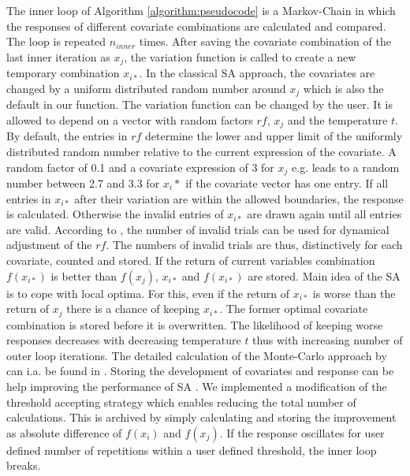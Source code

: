 The inner loop of Algorithm \ref{algorithm:pseudocode} is a Markov-Chain in which the responses of different covariate combinations are calculated and compared. The loop is repeated $n_{inner}$ times. After saving the covariate combination of the last inner iteration as $x_j$, the variation function is called to create a new temporary combination $x_{i*}$. In the classical SA approach, the covariates are changed by a uniform distributed random number around $x_j$ \citep{kirkpatrick_1983} which is also the default in our function. The variation function can be changed by the user. It is allowed to depend on a vector with random factors $rf$, $x_j$ and the temperature $t$. By default, the entries in $rf$ determine the lower and upper limit of the uniformly distributed random number relative to the current expression of the covariate. A random factor of 0.1 and a covariate expression of 3 for $x_j$ e.g. leads to a random number between 2.7 and 3.3 for $x_i*$ if the covariate vector has one entry. If all entries in $x_{i*}$ after their variation are within the allowed boundaries, the response is calculated. Otherwise the invalid entries of $x_{i*}$ are drawn again until all entries are valid. According to \citet{corana_1987}, the number of invalid trials can be used for dynamical adjustment of the $rf$. The numbers of invalid trials are thus, distinctively for each covariate, counted and stored. If the return of current variables combination $f(x_{i*})$ is better than $f(x_j)$, $x_{i*}$ and $f(x_{i*})$ are stored. Main idea of the SA is to cope with local optima. For this, even if the return of $x_{i*}$ is worse than the return of $x_{j}$ there is a chance of keeping  $x_{i*}$. The former optimal covariate combination is stored before it is overwritten. The likelihood of keeping worse responses decreases with decreasing temperature $t$ thus with increasing number of outer loop iterations. The detailed calculation of the Monte-Carlo approach by \citet{metropolis_1953} can i.a. be found in \citet{kirkpatrick_1983}. Storing the development of covariates and response can be help improving the performance of SA \citep{lin_1995, hansen_2012}. We implemented a modification of the threshold accepting strategy \citep{dueck_1990} which enables reducing the total number of calculations. This is archived by simply calculating and storing the improvement as absolute difference of $f(x_{i})$ and $f(x_j)$. If the response oscillates for user defined number of repetitions within a user defined threshold, the inner loop breaks.

